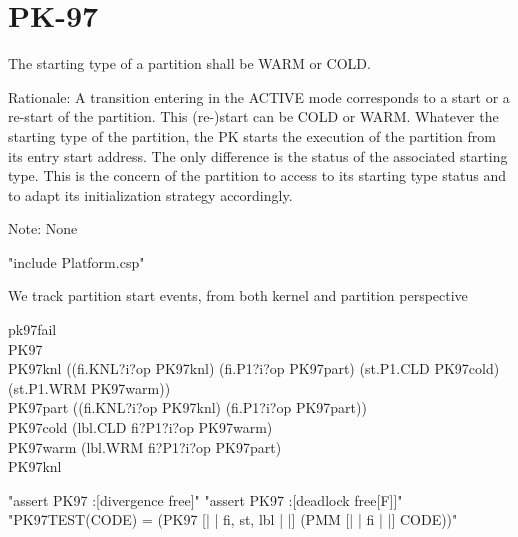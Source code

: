\section{PK-97} %

       The starting type of a partition shall be WARM or COLD.

  Rationale: A transition entering in the ACTIVE mode corresponds to a start or
  a re-start of the partition. This (re-)start can be COLD or WARM. Whatever the
  starting type of the partition, the PK starts the execution of the partition
  from its entry start address. The only difference is the status of the
  associated starting type. This is the concern of the partition to access to
  its starting type status and to adapt its initialization strategy accordingly.

  Note: None

\begin{assert}
"include Platform.csp"
\end{assert}
 We track partition start events, from both kernel and partition perspective

\begin{circus}
\circchannel pk97fail\\

\circprocess PK97 \circdef \circbegin\\

  PK97knl \circdef ((fi.KNL?i?op \then PK97knl)  %
     \extchoice (fi.P1?i?op \then PK97part)  %
     \extchoice (st.P1.CLD \then PK97cold)
     \extchoice (st.P1.WRM \then PK97warm))\\

  PK97part \circdef ((fi.KNL?i?op \then PK97knl)  %
     \extchoice (fi.P1?i?op \then PK97part))\\  %

  PK97cold \circdef (lbl.CLD \then fi?P1?i?op \then PK97warm)\\ %

  PK97warm \circdef (lbl.WRM \then fi?P1?i?op \then PK97part)\\ %

  \circspot PK97knl\\ %
  \circend
\end{circus}
\begin{assert}
"assert PK97 :[divergence free]"
\also "assert PK97 :[deadlock free[F]]"
\also "PK97TEST(CODE) = (PK97 [| {| fi, st, lbl |} |] (PMM [| {| fi |} |] CODE))"
\end{assert}
